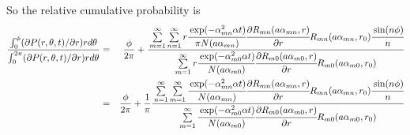 \documentclass{article}
\begin{document}
%
So the relative cumulative probability is
%
\begin{eqnarray}
    \frac{\int_0^{\phi} (\partial P(r, \theta, t)/\partial r) rd\theta}
         {\int_0^{2\pi} (\partial P(r, \theta, t)/\partial r) rd\theta}
    &=& \frac{\phi}{2\pi} +
    \cfrac{
        \sum\limits_{m=1}^{\infty}\sum\limits_{n=1}^{\infty}
        r\cfrac{\exp(-\alpha_{mn}^2\alpha t)}{\pi N(a\alpha_{mn})}
        \cfrac{\partial R_{mn}(a\alpha_{mn}, r)}{\partial r}
        R_{mn}(a\alpha_{mn}, r_0)
        \cfrac{\sin(n\phi)}{n}
    }{
        \sum\limits_{m=1}^{\infty}
        r\cfrac{\exp(-\alpha_{m0}^2\alpha t)}{N(a\alpha_{m0})}
        \cfrac{\partial R_{m0}(a\alpha_{m0}, r)}{\partial r}
        R_{m0}(a\alpha_{m0}, r_0)
    }
\nonumber\\
    &=& \frac{\phi}{2\pi} + \frac{1}{\pi}
    \cfrac{
        \sum\limits_{n=1}^{\infty}\sum\limits_{m=1}^{\infty}
        \cfrac{\exp(-\alpha_{mn}^2\alpha t)}{N(a\alpha_{mn})}
        \cfrac{\partial R_{mn}(a\alpha_{mn}, r)}{\partial r}
        R_{mn}(a\alpha_{mn}, r_0) \cfrac{\sin(n\phi)}{n}
    }{
        \sum\limits_{m=1}^{\infty}
        \cfrac{\exp(-\alpha_{m0}^2\alpha t)}{N(a\alpha_{m0})}
        \cfrac{\partial R_{m0}(a\alpha_{m0}, r)}{\partial r}
        R_{m0}(a\alpha_{m0}, r_0)
    }
\end{eqnarray}
\end{document}
